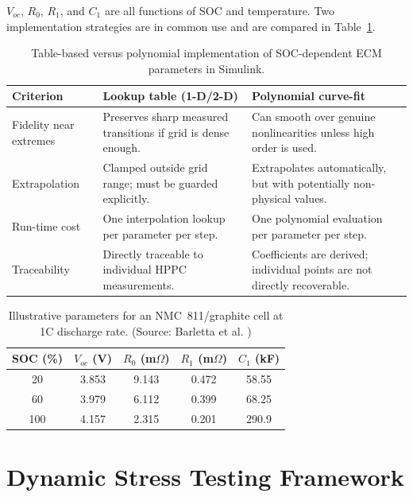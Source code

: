 $V_{oc}$, $R_0$, $R_1$, and $C_1$ are all functions of SOC and temperature. Two implementation strategies are in common use and are compared in Table~\ref{tab:10_lookup_vs_poly}.

\begin{table}[htbp]
\centering
\caption{Table-based versus polynomial implementation of SOC-dependent ECM parameters in Simulink.}
\label{tab:10_lookup_vs_poly}
\renewcommand{\arraystretch}{1.3}
\begin{tabularx}{\textwidth}{@{}l X X@{}}
\toprule
\textbf{Criterion} & \textbf{Lookup table (1-D/2-D)} & \textbf{Polynomial curve-fit} \\
\midrule
Fidelity near extremes & Preserves sharp measured transitions if grid is dense enough. & Can smooth over genuine nonlinearities unless high order is used. \\
Extrapolation & Clamped outside grid range; must be guarded explicitly. & Extrapolates automatically, but with potentially non-physical values. \\
Run-time cost & One interpolation lookup per parameter per step. & One polynomial evaluation per parameter per step. \\
Traceability & Directly traceable to individual HPPC measurements. & Coefficients are derived; individual points are not directly recoverable. \\
\bottomrule
\end{tabularx}
\end{table}

\begin{table}[htbp]
\centering
\caption{Illustrative parameters for an NMC~811/graphite cell at 1C discharge rate. (Source: Barletta et al. \cite{barletta2022})}
\label{tab:10_barletta}
\begin{tabular}{ccccc}
\toprule
SOC (\%) & $V_{oc}$ (V) & $R_0$ (m$\Omega$) & $R_1$ (m$\Omega$) & $C_1$ (kF) \\
\midrule
20  & 3.853 & 9.143 & 0.472 & 58.55 \\
60  & 3.979 & 6.112 & 0.399 & 68.25 \\
100 & 4.157 & 2.315 & 0.201 & 290.9 \\
\bottomrule
\end{tabular}
\end{table}

\section{Dynamic Stress Testing Framework}
\label{sec:10_3}

